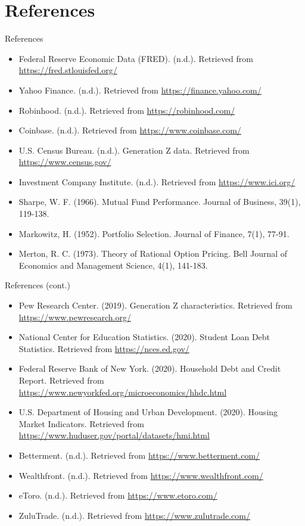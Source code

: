 \documentclass{beamer}
\begin{document}
\section{References}
\begin{frame}{References}
    \begin{itemize}
        \item Federal Reserve Economic Data (FRED). (n.d.). Retrieved from \url{https://fred.stlouisfed.org/}
        \item Yahoo Finance. (n.d.). Retrieved from \url{https://finance.yahoo.com/}
        \item Robinhood. (n.d.). Retrieved from \url{https://robinhood.com/}
        \item Coinbase. (n.d.). Retrieved from \url{https://www.coinbase.com/}
                \item U.S. Census Bureau. (n.d.). Generation Z data. Retrieved from \url{https://www.census.gov/}
        \item Investment Company Institute. (n.d.). Retrieved from \url{https://www.ici.org/}
        \item Sharpe, W. F. (1966). Mutual Fund Performance. Journal of Business, 39(1), 119-138.
        \item Markowitz, H. (1952). Portfolio Selection. Journal of Finance, 7(1), 77-91.
        \item Merton, R. C. (1973). Theory of Rational Option Pricing. Bell Journal of Economics and Management Science, 4(1), 141-183.
    \end{itemize}
\end{frame}

\begin{frame}{References (cont.)}
    \begin{itemize}
        \item Pew Research Center. (2019). Generation Z characteristics. Retrieved from \url{https://www.pewresearch.org/}
        \item National Center for Education Statistics. (2020). Student Loan Debt Statistics. Retrieved from \url{https://nces.ed.gov/}
        \item Federal Reserve Bank of New York. (2020). Household Debt and Credit Report. Retrieved from \url{https://www.newyorkfed.org/microeconomics/hhdc.html}
        \item U.S. Department of Housing and Urban Development. (2020). Housing Market Indicators. Retrieved from \url{https://www.huduser.gov/portal/datasets/hmi.html}
        \item Betterment. (n.d.). Retrieved from \url{https://www.betterment.com/}
        \item Wealthfront. (n.d.). Retrieved from \url{https://www.wealthfront.com/}
        \item eToro. (n.d.). Retrieved from \url{https://www.etoro.com/}
        \item ZuluTrade. (n.d.). Retrieved from \url{https://www.zulutrade.com/}
    \end{itemize}
\end{frame}
\end{document}
